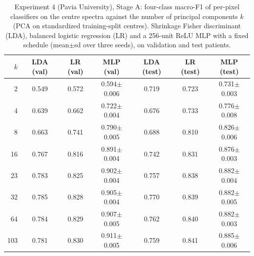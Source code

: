 \begin{table}[htbp]\centering\scriptsize
\caption{Experiment 4 (Pavia University), Stage A: four-class macro-F1 of per-pixel classifiers on the centre spectra against the number of principal components $k$ (PCA on standardized training-split centres). Shrinkage Fisher discriminant (LDA), balanced logistic regression (LR) and a 256-unit ReLU MLP with a fixed schedule (mean$\pm$sd over three seeds), on validation and test patients.}\label{tab:exp4_pixel_paviau}
\begin{tabular}{rcccccc}\toprule
$k$ & LDA (val) & LR (val) & MLP (val) & LDA (test) & LR (test) & MLP (test) \\ \midrule
2 & 0.549 & 0.572 & 0.594$\pm$0.006 & 0.719 & 0.723 & 0.731$\pm$0.003 \\
4 & 0.639 & 0.662 & 0.722$\pm$0.004 & 0.676 & 0.733 & 0.776$\pm$0.008 \\
8 & 0.663 & 0.741 & 0.790$\pm$0.005 & 0.688 & 0.810 & 0.826$\pm$0.006 \\
16 & 0.767 & 0.816 & 0.891$\pm$0.004 & 0.742 & 0.831 & 0.876$\pm$0.003 \\
23 & 0.783 & 0.825 & 0.902$\pm$0.004 & 0.757 & 0.838 & 0.882$\pm$0.004 \\
32 & 0.785 & 0.828 & 0.905$\pm$0.004 & 0.770 & 0.839 & 0.882$\pm$0.005 \\
64 & 0.784 & 0.829 & 0.907$\pm$0.005 & 0.762 & 0.840 & 0.882$\pm$0.003 \\
103 & 0.781 & 0.830 & 0.911$\pm$0.005 & 0.759 & 0.841 & 0.885$\pm$0.006 \\
\bottomrule\end{tabular}\end{table}
